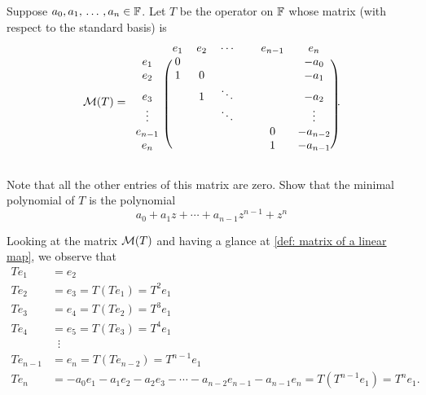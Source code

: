\begin{xrcs}
  Suppose $a_0, a_1, {\, \ldots \,\,}, a_n \in \mathbb{F}$. Let $T$ be the operator on $\mathbb{F}$ whose matrix (with respect to the standard basis) is
  \begin{equation}
    \mmatrix (T) =
    \begin{blockarray}{cccccccc}
               & e_1 & e_2 & \cdots & & e_{n-1} & e_n      \\
      \begin{block}{c(ccccccc)}
        e_1    & 0   &     &        & &         & -a_0     \\
        e_2    & 1   & 0   &        & &         & -a_1     \\
        e_3    &     & 1   & \ddots & &         & -a_2     \\
        \vdots &     &     & \ddots & &         &  \vdots  \\
        e_{n-1}&     &     &        & & 0       & -a_{n-2} \\
        e_n    &     &     &        & & 1       & -a_{n-1} \\
      \end{block}
    \end{blockarray}.
  \end{equation}

  Note that all the other entries of this matrix are zero. Show that the minimal polynomial of $T$ is the polynomial
  \begin{equation}
    a_0 + a_1 z + \cdots + a_{n-1} z^{n-1} + z^n
  \end{equation}

  \begin{xsol}
    Looking at the matrix $\mathcal{M}(T)$ and having a glance at \ref{def: matrix of a linear map}, we observe that
    \begin{equation}
      \begin{aligned}
        T e_1 &= e_2 \\
        T e_2 &= e_3 = T(Te_1) = T^2 e_1 \\
        T e_3 &= e_4 = T(Te_2) = T^3 e_1 \\
        T e_4 &= e_5 = T(Te_3) = T^4 e_1 \\
              & \; \; \vdots \\
        T e_{n-1} &= e_n = T(Te_{n-2}) = T^{n-1}e_1 \\
        T e_n &= -a_0 e_1  -a_1 e_2 - a_2 e_3 - \cdots - a_{n-2} e_{n-1} - a_{n-1} e_n
               = T (T^{n-1} e_1) = T^n e_1.
      \end{aligned}
    \end{equation}


\end{xsol}
\end{xrcs}
